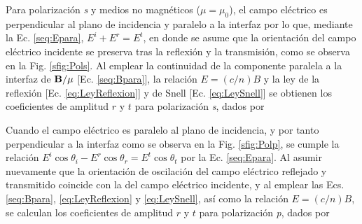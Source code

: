 Para polarización \emph{s} y medios no magnéticos ($\mu=\mu_0$),  el campo eléctrico es perpendicular al plano de incidencia y paralelo a la interfaz por lo que, mediante la Ec. \eqref{seq:Epara}, $E^i + E^r = E^t$, en donde se asume que la orientación del campo eléctrico incidente se preserva tras la reflexión y la transmisión, como se observa en la Fig. \ref{sfig:Pols}. Al emplear la continuidad de la componente paralela a la interfaz de $\vb{B}/\mu$ [Ec. \eqref{seq:Bpara}], la relación $E = (c/n) B$ y la ley de la reflexión [Ec. \eqref{eq:LeyReflexion}] y de Snell [Ec. \eqref{eq:LeySnell}] se obtienen los coeficientes de amplitud $r$ y $t$ para  polarización \emph{s}, dados por\vspace{-.5em}
%
	\begin{tcolorbox}[title = Coeficientes de amplitud para polarización \emph{s} ]
	\vspace*{-1em}	
	\end{tcolorbox}	 \vspace*{-.75em}\noindent
%
Cuando el campo eléctrico es paralelo al plano de incidencia, y por tanto perpendicular a la interfaz como se observa en la Fig. \ref{sfig:Polp}, se cumple la relación $E^i\cos\theta_i-E^r\cos\theta_r = E^t \cos\theta_t$ por la Ec. \eqref{seq:Epara}. Al asumir nuevamente que la orientación de oscilación del campo eléctrico reflejado y transmitido coincide con la del campo eléctrico incidente, y al emplear las Ecs. \eqref{seq:Bpara},  \eqref{eq:LeyReflexion} y  \eqref{eq:LeySnell}, así como la relación $E = (c/n) B$, se calculan los  coeficientes de amplitud $r$ y $t$ para  polarización \emph{p}, dados por  \vspace*{-.75em}
	\begin{tcolorbox}[title = Coeficientes de amplitud para polarización \emph{p} ]
	\vspace*{-1em}
	\end{tcolorbox}	

